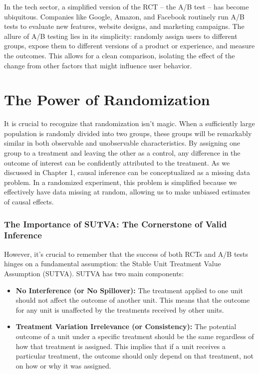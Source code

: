 \documentclass[
  letterpaper,
  DIV=11,
  numbers=noendperiod]{scrreprt}
\begin{document}
In the tech sector, a simplified version of the RCT -- the A/B test --
has become ubiquitous. Companies like Google, Amazon, and Facebook
routinely run A/B tests to evaluate new features, website designs, and
marketing campaigns. The allure of A/B testing lies in its simplicity:
randomly assign users to different groups, expose them to different
versions of a product or experience, and measure the outcomes. This
allows for a clean comparison, isolating the effect of the change from
other factors that might influence user behavior.

\chapter{The Power of Randomization}\label{the-power-of-randomization}

It is crucial to recognize that randomization isn't magic. When a
sufficiently large population is randomly divided into two groups, these
groups will be remarkably similar in both observable and unobservable
characteristics. By assigning one group to a treatment and leaving the
other as a control, any difference in the outcome of interest can be
confidently attributed to the treatment. As we discussed in Chapter 1,
causal inference can be conceptualized as a missing data problem. In a
randomized experiment, this problem is simplified because we effectively
have data missing at random, allowing us to make unbiased estimates of
causal effects.

\subsection{The Importance of SUTVA: The Cornerstone of Valid
Inference}\label{the-importance-of-sutva-the-cornerstone-of-valid-inference}

However, it's crucial to remember that the success of both RCTs and A/B
tests hinges on a fundamental assumption: the Stable Unit Treatment
Value Assumption (SUTVA). SUTVA has two main components:

\begin{itemize}
\item
  \textbf{No Interference (or No Spillover):} The treatment applied to
  one unit should not affect the outcome of another unit. This means
  that the outcome for any unit is unaffected by the treatments received
  by other units.
\item
  \textbf{Treatment Variation Irrelevance (or Consistency):} The
  potential outcome of a unit under a specific treatment should be the
  same regardless of how that treatment is assigned. This implies that
  if a unit receives a particular treatment, the outcome should only
  depend on that treatment, not on how or why it was assigned.
\end{itemize}
\end{document}
